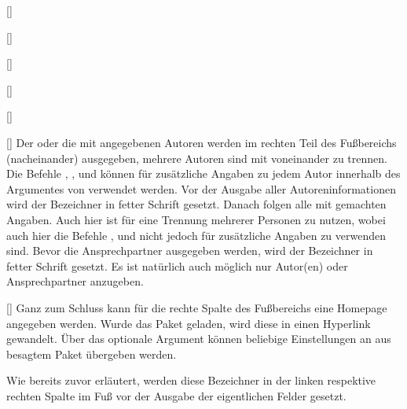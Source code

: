 \begin{Bundle*}[v2.05]{}
\begin{Declaration}{[]}
\begin{Declaration}{[]}
\begin{Declaration}{[]}
\begin{Declaration}{[]}
\begin{Declaration}{[]}
\begin{Declaration}{[]}
\printdeclarationlist%
%
Der oder die mit  angegebenen Autoren werden im rechten Teil des 
Fußbereichs (nacheinander) ausgegeben, mehrere Autoren sind mit  
voneinander zu trennen. Die Befehle , , 
 und  können für zusätzliche Angaben zu 
jedem Autor innerhalb des Argumentes von  verwendet werden. Vor 
der Ausgabe aller Autoreninformationen wird der Bezeichner  in 
fetter Schrift gesetzt. Danach folgen alle mit  gemachten 
Angaben. Auch hier ist  für eine Trennung mehrerer Personen zu 
nutzen, wobei auch hier die Befehle ,  und 
 nicht jedoch  für zusätzliche Angaben 
zu verwenden sind. Bevor die Ansprechpartner ausgegeben werden, wird der 
Bezeichner  in fetter Schrift gesetzt. Es ist natürlich 
auch möglich nur Autor(en) oder Ansprechpartner anzugeben.
\end{Declaration}
\end{Declaration}
\end{Declaration}
\end{Declaration}
\end{Declaration}
\end{Declaration}

\begin{Declaration}{[]}
\printdeclarationlist%
%
Ganz zum Schluss kann für die rechte Spalte des Fußbereichs eine Homepage 
angegeben werden. Wurde das Paket  geladen, wird diese in 
einen Hyperlink gewandelt. Über das optionale Argument können beliebige 
Einstellungen an  aus besagtem Paket übergeben werden.
\end{Declaration}

\begin{Declaration}{}
\begin{Declaration}{}
\begin{Declaration}{}
\printdeclarationlist%
%
Wie bereits zuvor erläutert, werden diese Bezeichner in der linken respektive 
rechten Spalte im Fuß vor der Ausgabe der eigentlichen Felder gesetzt.
\end{Declaration}
\end{Declaration}
\end{Declaration}


\end{Bundle*}
